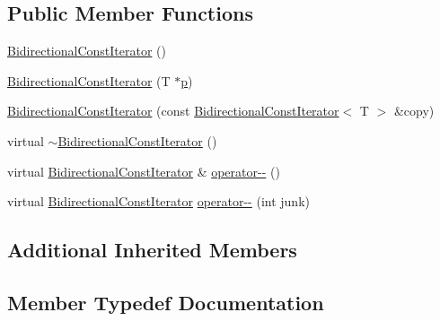\subsection*{Public Member Functions}
\begin{DoxyCompactItemize}
\item 
\hyperlink{classprism_1_1containers_1_1_bidirectional_const_iterator_a63bfe11de07f319183608e5a987f39da}{Bidirectional\+Const\+Iterator} ()
\item 
\hyperlink{classprism_1_1containers_1_1_bidirectional_const_iterator_a9c442f714f91c0ca590b3aa9b2d257bd}{Bidirectional\+Const\+Iterator} (T $\ast$\hyperlink{classprism_1_1containers_1_1_forward_const_iterator_a26647b955a51f4fb4d29d1b06dd75cd9}{p})
\item 
\hyperlink{classprism_1_1containers_1_1_bidirectional_const_iterator_abfff559b068197cd2a05d06e5b29b2e1}{Bidirectional\+Const\+Iterator} (const \hyperlink{classprism_1_1containers_1_1_bidirectional_const_iterator}{Bidirectional\+Const\+Iterator}$<$ T $>$ \&copy)
\item 
virtual \hyperlink{classprism_1_1containers_1_1_bidirectional_const_iterator_a25ac5a0324ef965ac48e81304679807f}{$\sim$\+Bidirectional\+Const\+Iterator} ()
\item 
virtual \hyperlink{classprism_1_1containers_1_1_bidirectional_const_iterator}{Bidirectional\+Const\+Iterator} \& \hyperlink{classprism_1_1containers_1_1_bidirectional_const_iterator_a446e06533d193b530ccbff57c618fb3e}{operator-\/-\/} ()
\item 
virtual \hyperlink{classprism_1_1containers_1_1_bidirectional_const_iterator}{Bidirectional\+Const\+Iterator} \hyperlink{classprism_1_1containers_1_1_bidirectional_const_iterator_a22fc20353f99704d1c66bb260618efec}{operator-\/-\/} (int junk)
\end{DoxyCompactItemize}
\subsection*{Additional Inherited Members}


\subsection{Member Typedef Documentation}
